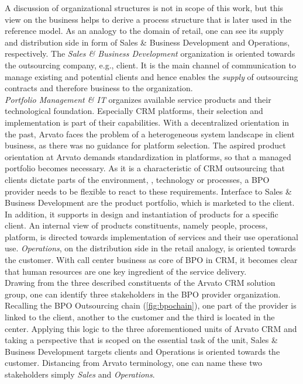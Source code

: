 A discussion of organizational structures is not in scope of this work, but this view on the business helps to derive a process structure that is later used in the reference model. As an analogy to the domain of retail, one can see its supply and distribution side in form of Sales \& Business Development and Operations, respectively. The \textit{Sales \& Business Development }organization is oriented towards the outsourcing company, e.g., client. It is the main channel of communication to manage existing and potential clients and hence enables the \textit{supply} of outsourcing contracts and therefore business to the organization.\\
 \textit{Portfolio Management \& IT} organizes available service products and their technological foundation. Especially CRM platforms, their selection and implementation is part of their capabilities. With a decentralized orientation in the past, Arvato faces the problem of a heterogeneous system landscape in client business, as there was no guidance for platform selection. The aspired product orientation at Arvato demands standardization in platforms, so that a managed portfolio becomes necessary. As it is a characteristic of CRM outsourcing that clients dictate parts of the environment, \eg, technology or processes, a BPO provider needs to be flexible to react to these requirements. Interface to Sales \& Business Development are the product portfolio, which is marketed to the client. In addition, it supports in design and instantiation of products for a specific client. An internal view of products constituents, namely people, process, platform, is directed towards implementation of services and their use operational use. 
  \textit{Operations}, on the distribution side in the retail analogy, is oriented towards the customer. With call center business as core of BPO in CRM, it becomes clear that human resources are one key ingredient of the service delivery.  \\
  
  Drawing from the three described constituents of the Arvato CRM solution group, one can identify three stakeholders in the BPO provider organization. Recalling the BPO Outsourcing chain (\Fig \ref{fig:bpochain}), one part of the provider is linked to the client, another to the customer and the third is located in the center. Applying this logic to the three aforementioned units of Arvato CRM and taking a perspective that is scoped on the essential task of the unit, Sales \& Business Development targets clients and Operations is oriented towards the customer. Distancing from Arvato terminology, one can name these two stakeholders simply \textit{Sales} and \textit{Operations}. \\
  

